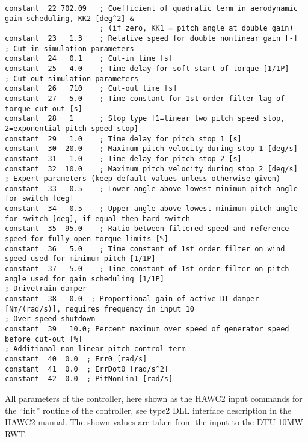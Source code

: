 \begin{table}[t!]
\begin{center}
\begin{verbatim}
constant  22 702.09   ; Coefficient of quadratic term in aerodynamic gain scheduling, KK2 [deg^2] &
                      ; (if zero, KK1 = pitch angle at double gain)
constant  23   1.3    ; Relative speed for double nonlinear gain [-]
; Cut-in simulation parameters
constant  24   0.1    ; Cut-in time [s]
constant  25   4.0    ; Time delay for soft start of torque [1/1P]
; Cut-out simulation parameters
constant  26   710    ; Cut-out time [s]
constant  27   5.0    ; Time constant for 1st order filter lag of torque cut-out [s]
constant  28   1      ; Stop type [1=linear two pitch speed stop, 2=exponential pitch speed stop]
constant  29   1.0    ; Time delay for pitch stop 1 [s]
constant  30  20.0    ; Maximum pitch velocity during stop 1 [deg/s]
constant  31   1.0    ; Time delay for pitch stop 2 [s]
constant  32  10.0    ; Maximum pitch velocity during stop 2 [deg/s]
; Expert parameters (keep default values unless otherwise given)
constant  33   0.5    ; Lower angle above lowest minimum pitch angle for switch [deg]
constant  34   0.5    ; Upper angle above lowest minimum pitch angle for switch [deg], if equal then hard switch
constant  35  95.0    ; Ratio between filtered speed and reference speed for fully open torque limits [%]
constant  36   5.0    ; Time constant of 1st order filter on wind speed used for minimum pitch [1/1P]
constant  37   5.0    ; Time constant of 1st order filter on pitch angle used for gain scheduling [1/1P]
; Drivetrain damper
constant  38   0.0  ; Proportional gain of active DT damper [Nm/(rad/s)], requires frequency in input 10
; Over speed shutdown
constant  39   10.0; Percent maximum over speed of generator speed before cut-out [%]
; Additional non-linear pitch control term
constant  40  0.0  ; Err0 [rad/s] 
constant  41  0.0  ; ErrDot0 [rad/s^2]
constant  42  0.0  ; PitNonLin1 [rad/s]
\end{verbatim}
\caption{All parameters of the controller, here shown as the HAWC2 input commands for the ``init'' routine of the controller, see type2 DLL interface description in the HAWC2 manual. The shown values are taken from the input to the DTU 10MW RWT. \label{t:init}}
\end{center}
\end{table}

